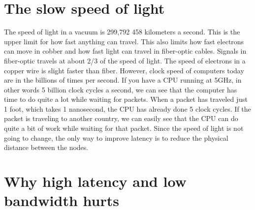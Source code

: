 \section{The slow speed of light}
The speed of light in a vacuum is 299,792 458 kilometers a second. This is the upper limit for how fast anything can travel. This also limits how fast electrons can move in cobber and how fast light can travel in fiber-optic cables. Signals in fiber-optic travels at about 2/3 of the speed of light. The speed of electrons in a copper wire is slight faster than fiber. However, clock speed of computers today are in the billions of times per second. If you have a CPU running at 5GHz, in other words 5 billion clock cycles a second, we can see that the computer has time to do quite a lot while waiting for packets. When a packet has traveled just 1 foot, which takes 1 nanosecond, the CPU has already done 5 clock cycles. If the packet is traveling to another country, we can easily see that the CPU can do quite a bit of work while waiting for that packet. Since the speed of light is not going to change, the only way to improve latency is to reduce the physical distance between the nodes.





\section{Why high latency and low bandwidth hurts}



